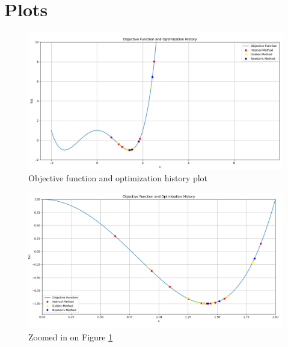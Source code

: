 \documentclass{article}
\begin{document}
    \section{Plots}
        \begin{figure}[H]
            \centering
            \includegraphics[width=1\textwidth]{plot-1.png}
            \caption{Objective function and optimization history plot}
            \label{fig:zoomed-out}
        \end{figure}
        \begin{figure}[H]
            \centering
            \includegraphics[width=1\textwidth]{plot-2.png}
            \caption{Zoomed in on Figure \ref{fig:zoomed-out}}
            \label{fig:zommed-in}
        \end{figure}
\end{document}
